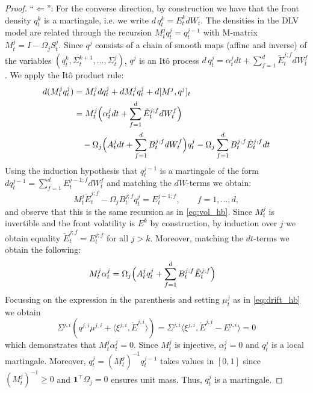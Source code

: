 \documentclass[11pt]{article}
\newcommand{\one}{\mathbf 1}
\theoremstyle{plain}
\theoremstyle{definition}
\theoremstyle{remark}
\begin{document}
\begin{proof}
    ``$\Leftarrow$'': For the converse direction, by construction we have that the front density $q^{k}_t$ is a martingale, i.e. we write $d\, q_t^k = E_t^k dW_t$. The densities in the DLV model are related through the recursion $M^j_t q^{j}_t = q^{j-1}_t$ with M-matrix $M^j_t = I - \Omega_j S^j_t$. Since $q^{j}$ consists of a chain of smooth maps (affine and inverse) of the variables $(q^k_t, \Sigma^{k+1}_t, \dots, \Sigma^{j}_t)$, $q^{j}$ is an Itô process $d \, q_t^j = \alpha_t^j dt + \sum_{f=1}^d \tilde E_t^{j;f} d W_t^f$. 
    We apply the Itô product rule: 
    \begin{align*}
      d (M^j_t q^j_t) &= M^j_t dq^j_t + dM^j_t q^j_t + d[M^j, q^j]_t \\ 
      & =  M^j_t \Bigl(\alpha_t^j dt + \sum_{f=1}^d \tilde E_t^{j;f} dW_t^f\Bigr) \\ & \quad - \Omega_j \Bigl(A^j_t dt + \sum_{f=1}^d B^{j;f}_t dW_t^f\Bigr) q^j_t - \Omega_j \sum_{f=1}^d B_t^{j;f} \tilde E_t^{j;f} dt 
    \end{align*}
    Using the induction hypothesis that $q^{j-1}_t$ is a martingale of the form $dq^{j-1}_t = \sum_{f=1}^d E^{j-1;f}_t dW_t^f$ and matching the $dW$-terms we obtain: 
    \begin{equation*}
      M_t^j \tilde E_t^{j;f} - \Omega_j B_t^{j;f} q_t^j = E^{j-1;f}_t, \qquad f = 1, \dots, d, 
    \end{equation*}
    and observe that this is the same recursion as in \eqref{eq:vol_hb}. Since $M^j_t$ is invertible and the front volatility is $E^k$ by construction, by induction over $j$ we obtain equality $\tilde E_t^{j;f} = E_t^{j;f}$ for all $j > k$. Moreover, matching the $dt$-terms we obtain the following: 
    \begin{align*}
      M^j_t \alpha_t^j & = \Omega_j \Bigl(A_t^j q^j_t + \sum_{f=1}^d B_t^{j;f} \tilde E_t^{j;f}\Bigr) 
    \end{align*}
    Focussing on the expression in the parenthesis and setting $\mu_t^j$ as in \eqref{eq:drift_hb} we obtain 
    \begin{equation*}
      \Sigma^{j,i} (q^{j,i} \mu^{j,i} + \langle \xi^{j,i}, \tilde E^{j,i} \rangle) 
      = \Sigma^{j,i} \langle \xi^{j,i}, \tilde E^{j,i} - E^{j, i} \rangle = 0 
    \end{equation*}
    which demonstrates that $M^j_t \alpha_t^j = 0$. Since $M^j_t$ is injective, $\alpha_t^j = 0$ and $q_t^j$ is a local martingale. Moreover, $q_t^j = (M^j_t)^{-1}q_t^{j-1}$ takes values in $[0, 1]$ since $(M^j_t)^{-1} \geq 0$ and $\one^\top\Omega_j=0$ ensures unit mass. Thus, $q_t^j$ is a martingale. 
  \end{proof}
\end{document}
